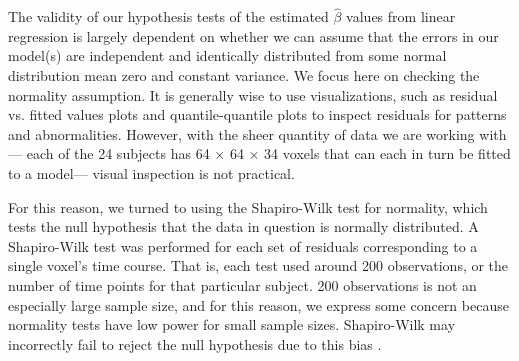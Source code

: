 \par \indent The validity of our hypothesis tests of the estimated 
$\hat{\beta}$ values from linear regression is largely dependent on whether we 
can assume that the errors in our model(s) are independent and identically 
distributed from some normal distribution mean zero and constant variance. 
We focus here on checking the normality assumption. It is generally wise to 
use visualizations, such as residual vs. fitted values plots and 
quantile-quantile plots to inspect residuals for patterns and abnormalities. 
However, with the sheer quantity of data we are working with--- each of the 
24 subjects has 64 $\times$ 64 $\times$ 34 voxels that can each in turn be 
fitted to a model--- visual inspection is not practical. 

For this reason, we turned to using the Shapiro-Wilk test for normality, 
which tests the null hypothesis that the data in question is normally 
distributed. A Shapiro-Wilk test was performed for each set of residuals 
corresponding to a single voxel's time course. That is, each test used around 
200 observations, or the number of time points for that particular subject. 
200 observations is not an especially large sample size, and for this reason, 
we express some concern because normality tests have low power for small sample 
sizes. Shapiro-Wilk may incorrectly fail to reject the null hypothesis due to 
this bias \cite{ghasemi2012normality}. 
